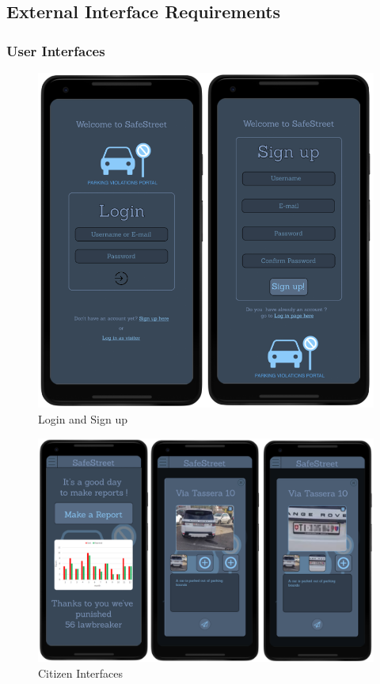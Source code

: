 \subsection{External Interface Requirements}
\subsubsection{User Interfaces}


\begin{figure}[h]
\centering
\includegraphics[width=\textwidth]{Images/login_signup.png}
\caption{\label{fig:ls}Login and Sign up }
\end{figure}

\begin{figure}[h]
\centering
\includegraphics[width=\textwidth]{Images/user_interface.png}
\caption{\label{fig:CI}Citizen Interfaces}
\end{figure}

